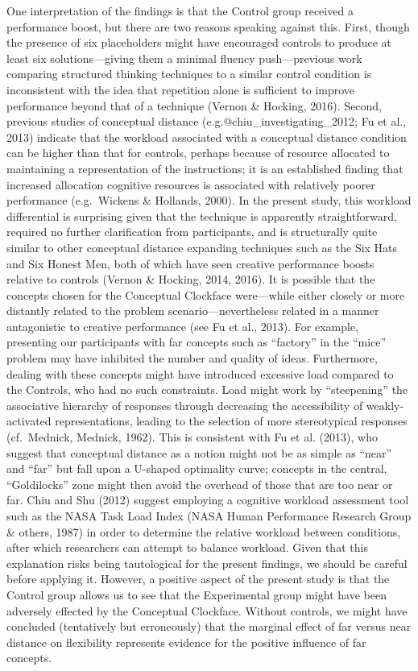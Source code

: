 \documentclass[english,man]{apa6}
\begin{document}
One interpretation of the findings is that the Control group received a
performance boost, but there are two reasons speaking against this.
First, though the presence of six placeholders might have encouraged
controls to produce at least six solutions---giving them a minimal
fluency push---previous work comparing structured thinking techniques to
a similar control condition is inconsistent with the idea that
repetition alone is sufficient to improve performance beyond that of a
technique (Vernon \& Hocking, 2016). Second, previous studies of
conceptual distance (e.g.@chiu\_investigating\_2012; Fu et al., 2013)
indicate that the workload associated with a conceptual distance
condition can be higher than that for controls, perhaps because of
resource allocated to maintaining a representation of the instructions;
it is an established finding that increased allocation cognitive
resources is associated with relatively poorer performance (e.g.~Wickens
\& Hollands, 2000). In the present study, this workload differential is
surprising given that the technique is apparently straightforward,
required no further clarification from participants, and is structurally
quite similar to other conceptual distance expanding techniques such as
the Six Hats and Six Honest Men, both of which have seen creative
performance boosts relative to controls (Vernon \& Hocking, 2014, 2016).
It is possible that the concepts chosen for the Conceptual Clockface
were---while either closely or more distantly related to the problem
scenario---nevertheless related in a manner antagonistic to creative
performance (see Fu et al., 2013). For example, presenting our
participants with far concepts such as \enquote{factory} in the
\enquote{mice} problem may have inhibited the number and quality of
ideas. Furthermore, dealing with these concepts might have introduced
excessive load compared to the Controls, who had no such constraints.
Load might work by \enquote{steepening} the associative hierarchy of
responses through decreasing the accessibility of weakly-activated
representations, leading to the selection of more stereotypical
responses (cf.~Mednick, Mednick, 1962). This is consistent with Fu et
al. (2013), who suggest that conceptual distance as a notion might not
be as simple as \enquote{near} and \enquote{far} but fall upon a
U-shaped optimality curve; concepts in the central, \enquote{Goldilocks}
zone might then avoid the overhead of those that are too near or far.
Chiu and Shu (2012) suggest employing a cognitive workload assessment
tool such as the NASA Task Load Index (NASA Human Performance Research
Group \& others, 1987) in order to determine the relative workload
between conditions, after which researchers can attempt to balance
workload. Given that this explanation risks being tautological for the
present findings, we should be careful before applying it. However, a
positive aspect of the present study is that the Control group allows us
to see that the Experimental group might have been adversely effected by
the Conceptual Clockface. Without controls, we might have concluded
(tentatively but erroneously) that the marginal effect of far versus
near distance on flexibility represents evidence for the positive
influence of far concepts.
\end{document}
